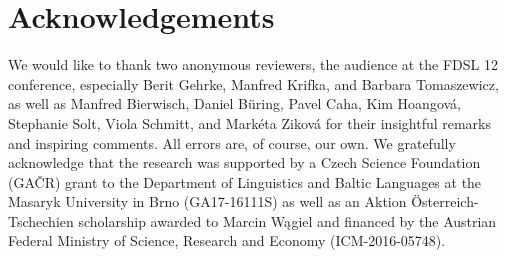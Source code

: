 \documentclass[output=paper,
modfonts,
hidelinks,
newtxmath
]{langscibook}
\begin{document}
\section*{Acknowledgements}
We would like to thank two anonymous reviewers, the audience at the FDSL 12 conference, especially Berit Gehrke, Manfred Krifka, and Barbara Tomaszewicz, as well as Manfred Bierwisch, Daniel Büring, Pavel Caha, Kim Hoangová, Stepha\-nie Solt, Viola Schmitt, and Markéta Ziková for their insightful remarks and inspiring comments. All errors are, of course, our own. We gratefully acknowledge that the research was supported by a Czech Science Foundation (GAČR) grant to the Department of Linguistics and Baltic Languages at the Masaryk University in Brno (GA17-16111S) as well as an Aktion Österreich-Tschechien scholarship awarded to Marcin Wągiel and financed by the Austrian Federal Ministry of Science, Research and Economy (ICM-2016-05748).

\sloppy
\printbibliography[heading=subbibliography,notkeyword=this]
\end{document}
